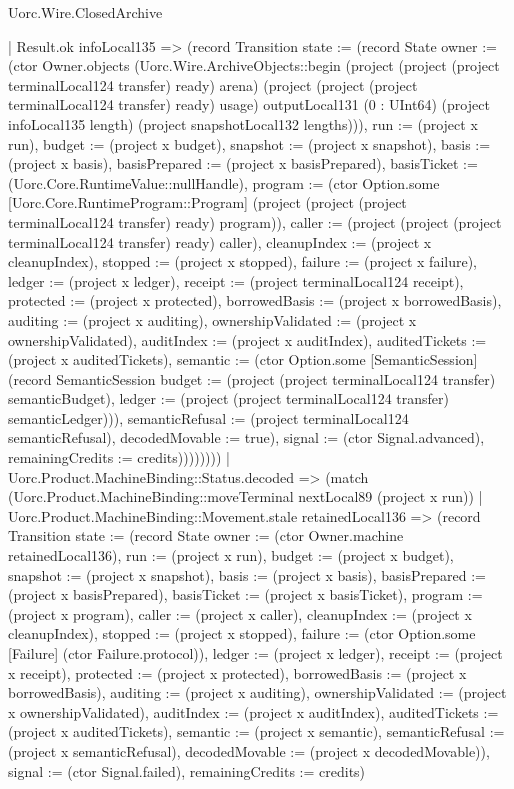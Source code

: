 \begin{lexlean}{Uorc.Wire.ClosedArchive}
\begin{semanticmodule}
{                | Result.ok infoLocal135 => (record Transition {state := (record State {owner := (ctor Owner.objects (Uorc.Wire.ArchiveObjects::begin (project (project (project terminalLocal124 transfer) ready) arena) (project (project (project terminalLocal124 transfer) ready) usage) outputLocal131 (0 : UInt64) (project infoLocal135 length) (project snapshotLocal132 lengths))), run := (project x run), budget := (project x budget), snapshot := (project x snapshot), basis := (project x basis), basisPrepared := (project x basisPrepared), basisTicket := (Uorc.Core.RuntimeValue::nullHandle), program := (ctor Option.some [Uorc.Core.RuntimeProgram::Program] (project (project (project terminalLocal124 transfer) ready) program)), caller := (project (project (project terminalLocal124 transfer) ready) caller), cleanupIndex := (project x cleanupIndex), stopped := (project x stopped), failure := (project x failure), ledger := (project x ledger), receipt := (project terminalLocal124 receipt), protected := (project x protected), borrowedBasis := (project x borrowedBasis), auditing := (project x auditing), ownershipValidated := (project x ownershipValidated), auditIndex := (project x auditIndex), auditedTickets := (project x auditedTickets), semantic := (ctor Option.some [SemanticSession] (record SemanticSession {budget := (project (project terminalLocal124 transfer) semanticBudget), ledger := (project (project terminalLocal124 transfer) semanticLedger)})), semanticRefusal := (project terminalLocal124 semanticRefusal), decodedMovable := true}), signal := (ctor Signal.advanced), remainingCredits := credits}))))))))
    | Uorc.Product.MachineBinding::Status.decoded => (match (Uorc.Product.MachineBinding::moveTerminal nextLocal89 (project x run))
      | Uorc.Product.MachineBinding::Movement.stale retainedLocal136 => (record Transition {state := (record State {owner := (ctor Owner.machine retainedLocal136), run := (project x run), budget := (project x budget), snapshot := (project x snapshot), basis := (project x basis), basisPrepared := (project x basisPrepared), basisTicket := (project x basisTicket), program := (project x program), caller := (project x caller), cleanupIndex := (project x cleanupIndex), stopped := (project x stopped), failure := (ctor Option.some [Failure] (ctor Failure.protocol)), ledger := (project x ledger), receipt := (project x receipt), protected := (project x protected), borrowedBasis := (project x borrowedBasis), auditing := (project x auditing), ownershipValidated := (project x ownershipValidated), auditIndex := (project x auditIndex), auditedTickets := (project x auditedTickets), semantic := (project x semantic), semanticRefusal := (project x semanticRefusal), decodedMovable := (project x decodedMovable)}), signal := (ctor Signal.failed), remainingCredits := credits})
}
\end{semanticmodule}
\end{lexlean}
